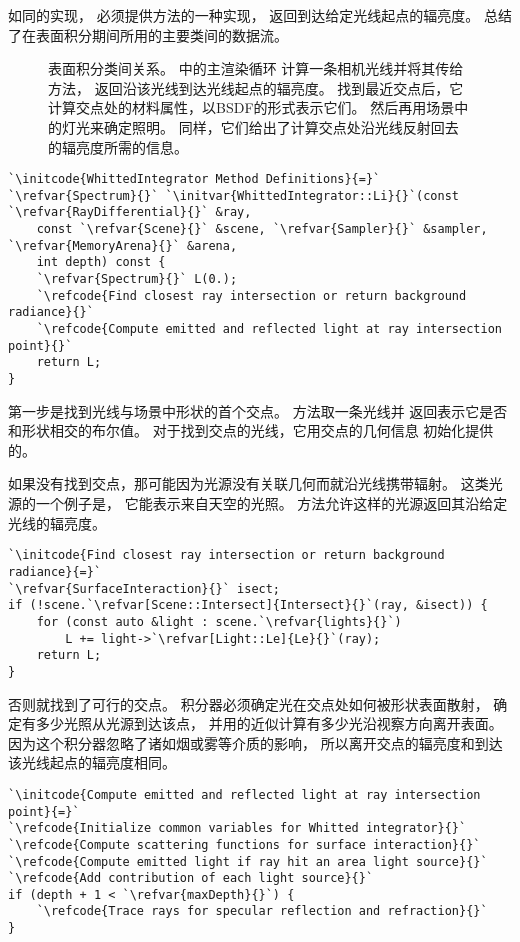 如同的实现，
必须提供方法的一种实现，
返回到达给定光线起点的辐亮度。
总结了在表面积分期间所用的主要类间的数据流。
\begin{figure}[htbp]
    \centering
    \caption{表面积分类间关系。
        \protect{}中的主渲染循环
        计算一条相机光线并将其传给方法\protect{}，
        返回沿该光线到达光线起点的辐亮度。
        找到最近交点后，它计算交点处的材料属性，以BSDF的形式表示它们。
        然后再用场景中的灯光来确定照明。
        同样，它们给出了计算交点处沿光线反射回去的辐亮度所需的信息。}
    \label{fig:1.19}
\end{figure}
\begin{lstlisting}
`\initcode{WhittedIntegrator Method Definitions}{=}`
`\refvar{Spectrum}{}` `\initvar{WhittedIntegrator::Li}{}`(const `\refvar{RayDifferential}{}` &ray,
    const `\refvar{Scene}{}` &scene, `\refvar{Sampler}{}` &sampler, `\refvar{MemoryArena}{}` &arena,
    int depth) const {
    `\refvar{Spectrum}{}` L(0.);
    `\refcode{Find closest ray intersection or return background radiance}{}`
    `\refcode{Compute emitted and reflected light at ray intersection point}{}`
    return L;
}
\end{lstlisting}

第一步是找到光线与场景中形状的首个交点。
方法取一条光线并
返回表示它是否和形状相交的布尔值。
对于找到交点的光线，它用交点的几何信息
初始化提供的。

如果没有找到交点，那可能因为光源没有关联几何而就沿光线携带辐射。
这类光源的一个例子是，
它能表示来自天空的光照。
方法允许这样的光源返回其沿给定光线的辐亮度。
\begin{lstlisting}
`\initcode{Find closest ray intersection or return background radiance}{=}`
`\refvar{SurfaceInteraction}{}` isect;
if (!scene.`\refvar[Scene::Intersect]{Intersect}{}`(ray, &isect)) {
    for (const auto &light : scene.`\refvar{lights}{}`)
        L += light->`\refvar[Light::Le]{Le}{}`(ray);
    return L;
}
\end{lstlisting}

否则就找到了可行的交点。
积分器必须确定光在交点处如何被形状表面散射，
确定有多少光照从光源到达该点，
并用的近似计算有多少光沿视察方向离开表面。
因为这个积分器忽略了诸如烟或雾等介质的影响，
所以离开交点的辐亮度和到达该光线起点的辐亮度相同。
\begin{lstlisting}
`\initcode{Compute emitted and reflected light at ray intersection point}{=}`
`\refcode{Initialize common variables for Whitted integrator}{}`
`\refcode{Compute scattering functions for surface interaction}{}`
`\refcode{Compute emitted light if ray hit an area light source}{}`
`\refcode{Add contribution of each light source}{}`
if (depth + 1 < `\refvar{maxDepth}{}`) {
    `\refcode{Trace rays for specular reflection and refraction}{}`
}
\end{lstlisting}

